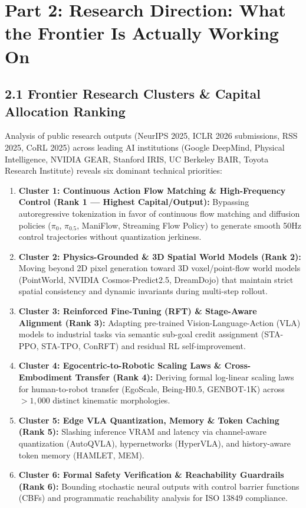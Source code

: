 \documentclass[11pt,a4paper]{article}
\begin{document}
\section{Part 2: Research Direction: What the Frontier Is Actually Working On}

\subsection{2.1 Frontier Research Clusters \& Capital Allocation Ranking}
Analysis of public research outputs (NeurIPS 2025, ICLR 2026 submissions, RSS 2025, CoRL 2025) across leading AI institutions (Google DeepMind, Physical Intelligence, NVIDIA GEAR, Stanford IRIS, UC Berkeley BAIR, Toyota Research Institute) reveals six dominant technical priorities:

\begin{enumerate}
    \item \textbf{Cluster 1: Continuous Action Flow Matching \& High-Frequency Control (Rank 1 --- Highest Capital/Output):} Bypassing autoregressive tokenization in favor of continuous flow matching and diffusion policies ($\pi_0$, $\pi_{0.5}$, ManiFlow, Streaming Flow Policy) to generate smooth 50Hz control trajectories without quantization jerkiness.
    \item \textbf{Cluster 2: Physics-Grounded \& 3D Spatial World Models (Rank 2):} Moving beyond 2D pixel generation toward 3D voxel/point-flow world models (PointWorld, NVIDIA Cosmos-Predict2.5, DreamDojo) that maintain strict spatial consistency and dynamic invariants during multi-step rollout.
    \item \textbf{Cluster 3: Reinforced Fine-Tuning (RFT) \& Stage-Aware Alignment (Rank 3):} Adapting pre-trained Vision-Language-Action (VLA) models to industrial tasks via semantic sub-goal credit assignment (STA-PPO, STA-TPO, ConRFT) and residual RL self-improvement.
    \item \textbf{Cluster 4: Egocentric-to-Robotic Scaling Laws \& Cross-Embodiment Transfer (Rank 4):} Deriving formal log-linear scaling laws for human-to-robot transfer (EgoScale, Being-H0.5, GENBOT-1K) across $>1,000$ distinct kinematic morphologies.
    \item \textbf{Cluster 5: Edge VLA Quantization, Memory \& Token Caching (Rank 5):} Slashing inference VRAM and latency via channel-aware quantization (AutoQVLA), hypernetworks (HyperVLA), and history-aware token memory (HAMLET, MEM).
    \item \textbf{Cluster 6: Formal Safety Verification \& Reachability Guardrails (Rank 6):} Bounding stochastic neural outputs with control barrier functions (CBFs) and programmatic reachability analysis for ISO 13849 compliance.
\end{enumerate}
\end{document}
